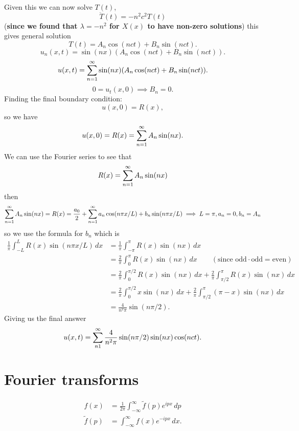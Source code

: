 \documentclass[10pt, a4paper]{article}
\begin{document}
\begin{example}
\begin{solution}
        Given this we can now solve $T(t)$,
        \[
        \ddot{T}(t) = -n ^ 2c ^ 2T(t)
        \]
        (\textbf{since we found that $\lambda = -n ^ 2$ for $X(x)$ to have non-zero solutions})
        this gives general solution
        \[
        T(t) = A_n\cos(nct) + B_n\sin(nct).
        \]
        \[
        u_n(x, t) = \sin(nx)(A_n\cos(nct) + B_n\sin(nct)).
        \]
        \[
        u(x, t) = \infsum[n = 1]\sin(nx)(A_n\cos(nct) + B_n\sin(nct)).
        \]
        \[
        0 = u_t(x, 0) \implies B_n = 0.
        \]
        Finding the final boundary condition:
        \[
        u(x, 0) = R(x),
        \]
        so we have
        \[
        u(x, 0) = R(x) = \infsum[n = 1]A_n\sin(nx).
        \]
        We can use the Fourier series to see that
        \[
        R(x) = \infsum[n = 1]A_n\sin(nx)
        \]
        then
        \[
        \infsum[n = 1]A_n\sin(nx) = R(x) = \frac{a_0}{2} + \infsum[n = 1]a_n\cos(n\pi x / L) + b_n\sin(n\pi x / L) \implies L = \pi, a_n = 0, b_n = A_n
        \]
        so we use the formula for $b_n$ which is
        \begin{align*}
            \frac{1}{\pi}\int_{-L}^{L}R(x)\sin(n\pi x / L)\,dx &= \frac{1}{\pi}\int_{-\pi}^{\pi}R(x)\sin(nx)\,dx \\
            &= \frac{2}{\pi}\int_{0}^{\pi}R(x)\sin(nx)\,dx\qquad(\text{since $\text{odd} \cdot \text{odd} = \text{even}$}) \\
            &= \frac{2}{\pi}\int_{0}^{\pi / 2}R(x)\sin(nx)\,dx + \frac{2}{\pi}\int_{\pi / 2}^{\pi}R(x)\sin(nx)\,dx \\
            &= \frac{2}{\pi}\int_{0}^{\pi / 2}x\sin(nx)\,dx + \frac{2}{\pi}\int_{\pi / 2}^{\pi}(\pi - x)\sin(nx)\,dx \\
            &= \frac{4}{n ^ 2\pi}\sin(n\pi / 2).
        \end{align*}
        Giving us the final answer
        \[
        u(x, t) = \infsum[n  1]\frac{4}{n ^ 2\pi}\sin(n\pi / 2)\sin(nx)\cos(nct).
        \]
    \end{solution}
    
\end{example}

\newpage

\section{Fourier transforms}
\begin{align*}
    f(x) &= \frac{1}{2\pi}\int_{-\infty}^{\infty}\tilde{f}(p)e ^ {ipx}\,dp \\
    \tilde{f}(p) &= \int_{-\infty}^{\infty}f(x)e ^ {-ipx}\,dx.
\end{align*}
\end{document}
